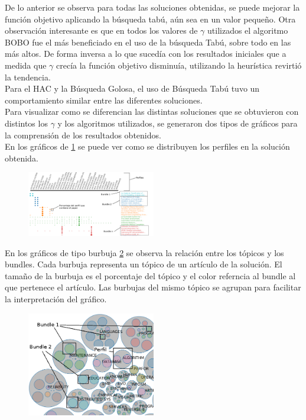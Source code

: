De lo anterior se observa para todas las soluciones obtenidas, se puede mejorar la función objetivo aplicando la búsqueda tabú, aún sea en un valor pequeño. Otra observación interesante es que en todos los valores de $\gamma$ utilizados el algoritmo BOBO fue el más beneficiado en el uso de la búsqueda Tabú, sobre todo en las más altos. De forma inversa a lo que sucedía con los resultados iniciales que a medida que $\gamma$ crecía la función objetivo disminuía, utilizando la heurística revirtió la tendencia.\\
Para el HAC y la Búsqueda Golosa, el uso de Búsqueda Tabú tuvo un comportamiento similar entre las diferentes soluciones.\\
Para visualizar como se diferencian las distintas soluciones que se obtuvieron con distintos los $\gamma$ y los algoritmos utilizados, se generaron dos tipos de gráficos para la comprensión de los resultados obtenidos.\\
En los gráficos de \ref{res:img-explain-bars} se puede ver como se distribuyen los perfiles en la solución obtenida.
\begin{figure}[H]
  \centering
    \includegraphics[width=0.5\textwidth]{img/explain-bars.png}
  \caption{}
  \label{res:img-explain-bars}
\end{figure}

En los gráficos de tipo burbuja \ref{res:img-explain-bubbles} se observa la relación entre los tópicos y los bundles. Cada burbuja representa un tópico de un artículo de la solución. El tamaño de la burbuja es el porcentaje del tópico y el color referncia al bundle al que pertenece el artículo. Las burbujas del mismo tópico se agrupan para facilitar la interpretación del gráfico.
\begin{figure}[H]
  \centering
    \includegraphics[width=0.5\textwidth]{img/explain-bubbles.png}
  \caption{}
  \label{res:img-explain-bubbles}
\end{figure}
